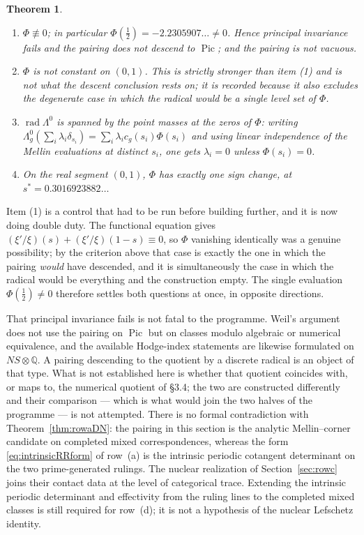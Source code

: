 \documentclass[11pt]{amsart}
\newtheorem{theorem}{Theorem}[section]
\theoremstyle{definition}
\theoremstyle{remark}
\newcommand{\Q}{\mathbb Q}
\begin{document}
\begin{theorem}\label{thm:principalradical}
\begin{enumerate}
\item $\Phi\not\equiv0$; in particular $\Phi(\tfrac12)=-2.2305907\ldots\ne0$.
Hence principal invariance fails and the pairing does not descend to
$\operatorname{Pic}$; and the pairing is not vacuous.
\item $\Phi$ is not constant on $(0,1)$.  This is strictly stronger than item
(1) and is \emph{not} what the descent conclusion rests on; it is recorded
because it also excludes the degenerate case in which the radical would be a
single level set of $\Phi$.
\item $\operatorname{rad}\Lambda^{0}$ is spanned by the point masses at the
zeros of $\Phi$: writing
$\Lambda_g^{0}(\sum_i\lambda_i\delta_{s_i})=\sum_i\lambda_ic_g(s_i)\Phi(s_i)$
and using linear independence of the Mellin evaluations at distinct $s_i$,
one gets $\lambda_i=0$ unless $\Phi(s_i)=0$.
\item On the real segment $(0,1)$, $\Phi$ has exactly one sign change, at
$s^{\ast}=0.3016923882\ldots$
\end{enumerate}
\end{theorem}

Item (1) is a control that had to be run before building further, and it is
now doing double duty.  The functional equation gives
$(\xi'/\xi)(s)+(\xi'/\xi)(1-s)\equiv0$, so $\Phi$ vanishing identically was a
genuine possibility; by the criterion above that case is exactly the one in
which the pairing \emph{would} have descended, and it is simultaneously the
case in which the radical would be everything and the construction empty.  The
single evaluation $\Phi(\tfrac12)\ne0$ therefore settles both questions at
once, in opposite directions.

That principal invariance fails is not fatal to the programme.  Weil's
argument does not use the pairing on $\operatorname{Pic}$ but on classes
modulo algebraic or numerical equivalence, and the available Hodge-index
statements are likewise formulated on $NS\otimes\Q$.  A pairing descending to
the quotient by a discrete radical is an object of that type.  What is not
established here is whether that quotient coincides with, or maps to, the
numerical quotient of \S3.4; the two are constructed differently and their
comparison --- which is what would join the two halves of the programme ---
is not attempted.  There is no formal contradiction with
Theorem~\ref{thm:rowaDN}: the pairing in this section is the analytic
Mellin--corner candidate on completed mixed correspondences, whereas the
form \eqref{eq:intrinsicRRform} of row~(a) is the intrinsic periodic cotangent determinant on the two
prime-generated rulings.  The nuclear realization of
Section~\ref{sec:rowc} joins their contact data at the level of categorical
trace.  Extending the intrinsic periodic determinant and effectivity from
the ruling lines to the completed mixed classes is still required for
row~(d); it is not a hypothesis of the nuclear Lefschetz identity.
\end{document}
